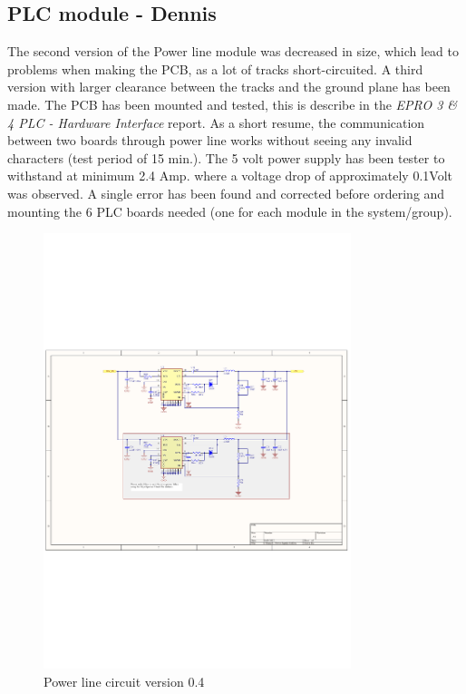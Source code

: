\subsection{PLC module - Dennis}
The second version of the Power line module was decreased in size, which lead to problems when making the PCB, as a lot of tracks short-circuited. A third version with larger clearance between the tracks and the ground plane has been made. The PCB has been mounted and tested, this is describe in the \textit{EPRO 3 \& 4 PLC - Hardware Interface} report. As a short resume, the communication between two boards through power line works without seeing any invalid characters (test period of 15 min.). The 5 volt power supply has been tester to withstand at minimum 2.4 Amp. where a voltage drop of approximately 0.1Volt was observed. 
A single error has been found and corrected before ordering and mounting the 6 PLC boards needed (one for each module in the system/group).

\begin{figure}[H]
	\begin{centering}
		 \includegraphics[width=0.8\textwidth,page=2,angle=0]{content/appendix/eudp/images/SIG60_v0_4}
		\caption{Power line circuit version 0.4}
	\end{centering}
\end{figure}

